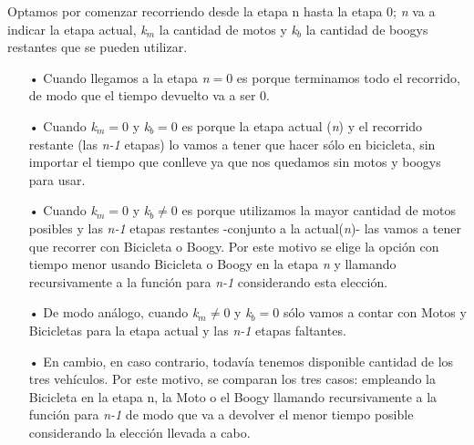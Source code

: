 Optamos por comenzar recorriendo desde la etapa n hasta la etapa 0; \emph{n} va a indicar la etapa actual, \emph{k$_m$} la cantidad de motos y \emph{k$_b$} la cantidad de boogys restantes que se pueden utilizar.

\begin{itemize}
\item[•]Cuando llegamos a la etapa \emph{n}$=0$ es porque terminamos todo el recorrido, de modo que el tiempo devuelto va a ser 0.

\item[•]Cuando \emph{k$_m$}$=0$ y \emph{k$_b$}$=0$ es porque la etapa actual (\emph{n}) y el recorrido restante (las \emph{n-1} etapas) lo vamos a tener que hacer s\'olo en bicicleta, sin importar el tiempo que conlleve ya que nos quedamos sin motos y boogys para usar.

\item[•]Cuando \emph{k$_m$}$=0$ y \emph{k$_b$}$\neq0$ es porque utilizamos la mayor cantidad de motos posibles y las \emph{n-1} etapas restantes -conjunto a la actual(\emph{n})- las vamos a tener que recorrer con Bicicleta o Boogy. Por este motivo se elige la opci\'on con tiempo menor usando Bicicleta o Boogy en la etapa \emph{n} y llamando recursivamente a la funci\'on para \emph{n-1} considerando esta elecci\'on.

\item[•]De modo an\'alogo, cuando \emph{k$_m$}$\neq0$ y \emph{k$_b$}$=0$ s\'olo vamos a contar con Motos y Bicicletas para la etapa actual y las \emph{n-1} etapas faltantes.

\item[•]En cambio, en caso contrario, todav\'ia tenemos disponible cantidad de los tres veh\'iculos. Por este motivo, se comparan los tres casos: empleando la Bicicleta en la etapa n, la Moto o el Boogy llamando recursivamente a la funci\'on para \emph{n-1} de modo que va a devolver el menor tiempo posible considerando la elecci\'on llevada a cabo.
\end{itemize}



